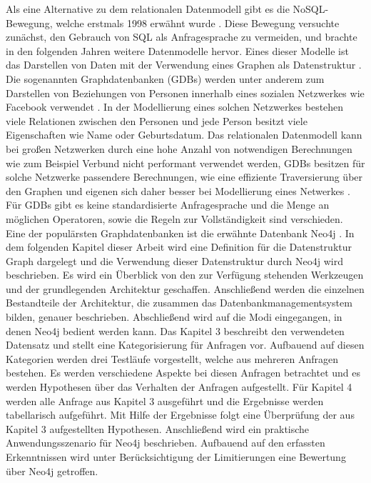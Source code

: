 Als eine Alternative zu dem relationalen Datenmodell gibt es die NoSQL-Bewegung, welche erstmals 1998 erwähnt wurde \parencite{NoSQL}. Diese Bewegung versuchte zunächst, den Gebrauch von SQL als Anfragesprache zu vermeiden, und brachte in den folgenden Jahren weitere Datenmodelle hervor. Eines dieser Modelle ist das Darstellen von Daten mit der Verwendung eines Graphen als Datenstruktur \parencite{miller2013graph}. Die sogenannten Graphdatenbanken (GDBs) werden unter anderem zum Darstellen von Beziehungen von Personen innerhalb eines sozialen Netzwerkes wie Facebook verwendet \parencite{han2011survey}. In der Modellierung eines solchen Netzwerkes bestehen viele Relationen zwischen den Personen und jede Person besitzt viele Eigenschaften wie Name oder Geburtsdatum. Das relationalen Datenmodell kann bei großen Netzwerken durch eine hohe Anzahl von notwendigen Berechnungen wie zum Beispiel Verbund nicht performant verwendet werden, GDBs besitzen für solche Netzwerke passendere Berechnungen, wie eine effiziente Traversierung über den Graphen und eigenen sich daher besser bei Modellierung eines Netwerkes \parencite{miller2013graph}. Für GDBs gibt es keine standardisierte Anfragesprache und  die Menge an möglichen Operatoren, sowie die Regeln zur Vollständigkeit sind verschieden.
Eine der populärsten Graphdatenbanken ist die erwähnte Datenbank Neo4j \parencite{francis2018cypher}.  \newline 
In dem folgenden Kapitel dieser Arbeit wird eine Definition für die Datenstruktur Graph dargelegt und die Verwendung dieser Datenstruktur durch Neo4j wird beschrieben. Es wird ein Überblick von den zur Verfügung stehenden Werkzeugen und der grundlegenden Architektur geschaffen. Anschließend werden die einzelnen Bestandteile der Architektur, die zusammen das Datenbankmanagementsystem bilden, genauer beschrieben. Abschließend wird auf die Modi eingegangen, in denen Neo4j bedient werden
kann. \newline
Das Kapitel 3 beschreibt den verwendeten Datensatz und stellt eine Kategorisierung
für Anfragen vor. Aufbauend auf diesen Kategorien werden drei Testläufe vorgestellt, welche aus mehreren Anfragen bestehen. Es werden verschiedene Aspekte
bei diesen Anfragen betrachtet und es werden Hypothesen über das Verhalten der
Anfragen aufgestellt. \newline
Für Kapitel 4 werden alle Anfrage aus Kapitel 3 ausgeführt und die Ergebnisse werden tabellarisch aufgeführt. Mit Hilfe der Ergebnisse folgt eine Überprüfung der
aus Kapitel 3 aufgestellten Hypothesen. Anschließend wird ein praktische Anwendungsszenario für Neo4j beschrieben. Aufbauend auf den erfassten Erkenntnissen
wird unter Berücksichtigung der Limitierungen eine Bewertung über Neo4j getroffen.

